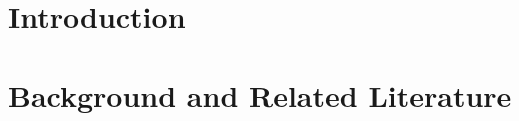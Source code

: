 \documentclass[openbib,12pt]{article}  %
\begin{document}
\newpage
\tableofcontents

\newpage

\section{Introduction}\label{EMIL_Section:intro}


\section{Background and Related Literature}\label{EMIL_Section:inst}








%

%

%

\newpage
\appendix
\end{document}
